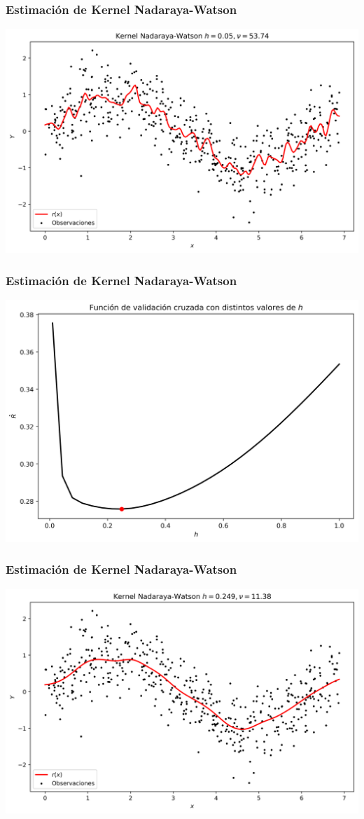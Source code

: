 \documentclass[aspectratio=169,spanish]{beamer}
\begin{document}
\begin{frame}
\frametitle{Estimación de Kernel Nadaraya-Watson}
\center
\includegraphics[scale=0.5]{regresion10}
\end{frame}

\begin{frame}
\frametitle{Estimación de Kernel Nadaraya-Watson}
\center
\includegraphics[scale=0.5]{cv1}
\end{frame}

\begin{frame}
\frametitle{Estimación de Kernel Nadaraya-Watson}
\center
\includegraphics[scale=0.5]{regresionOp}
\end{frame}
\end{document}
